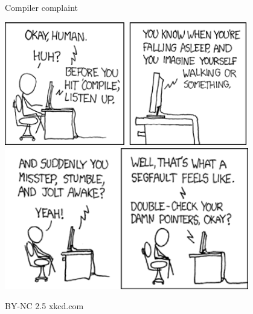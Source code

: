\documentclass[a6paper,fontsize=10pt,twoside,open=right]{scrbook}
\begin{document}
\vspace{15pt}

\newpage
\null
\vfill
{}
\begin{center}
  \tiny{Compiler complaint}\par
  \vspace{5pt}
  \includegraphics[keepaspectratio,width=0.8\textwidth]{elements/images/compiler_complaint_1.png}\\
  \includegraphics[keepaspectratio,width=0.8\textwidth]{elements/images/compiler_complaint_2.png}\par
  \vspace{5pt}
  \tiny{BY-NC 2.5 xkcd.com}
\end{center}
\par
\vspace{10pt}
\vfill
\null
\newpage

\newpage

\newpage

\vspace*{-10pt}
\newpage

\newpage

\vspace*{-10pt}
\newpage

\newpage

\vspace*{-11pt}
\newpage

\vspace{15pt}

\end{document}
